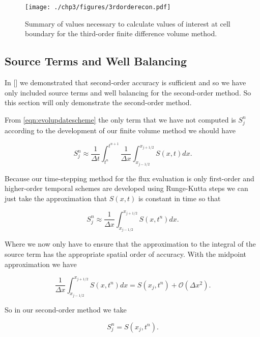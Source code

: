 
\begin{figure}
	\centering
	\texttt{[image: ./chp3/figures/3rdorderecon.pdf]}
	\caption{Summary of values necessary to calculate values of interest at cell boundary for the third-order finite difference volume method.}
	\label{fig:3rdorderrecon}
\end{figure}

\subsection{Source Terms and Well Balancing}
In [] we demonstrated that second-order accuracy is sufficient and so we have only included source terms and well balancing for the second-order method. So this section will only demonstrate the second-order method.

From \eqref{eqn:evolupdatescheme} the only term that we have not computed is $S^n_j$ according to the development of our finite volume method we should have

\begin{equation*}
S^n_j \approx \frac{1}{\Delta t} \int^{t^{n+1}}_{t^n}  \frac{1}{\Delta x}\int^{x_{j+1/2}}_{x_{j-1/2}} S (x,t) dx.
\end{equation*}

Because our time-stepping method for the flux evaluation is only first-order and higher-order temporal schemes are developed using Runge-Kutta steps we can just take the approximation that $S(x,t)$ is constant in time so that

\begin{equation*}
S^n_j \approx \frac{1}{\Delta x}\int^{x_{j+1/2}}_{x_{j-1/2}} S (x,t^n) dx.
\end{equation*}

Where we now only have to ensure that the approximation to the integral of the source term has the appropriate spatial order of accuracy. With the midpoint approximation we have

\begin{equation*}
\frac{1}{\Delta x}\int^{x_{j+1/2}}_{x_{j-1/2}} S (x,t^n) dx = S (x_j,t^n) + \mathcal{O} \left(\Delta x^2\right).
\end{equation*}

So in our second-order method we take

\begin{equation*}
S^n_j = S (x_j,t^n).
\end{equation*}

